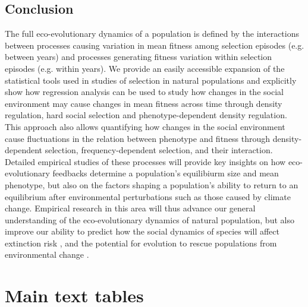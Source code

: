 \documentclass{article}
\begin{document}
\subsection{Conclusion}
 The full eco-evolutionary dynamics of a population is defined by the interactions between processes causing variation in mean fitness among selection episodes (e.g. between years) and processes generating fitness variation within selection episodes (e.g. within years). We provide an easily accessible expansion of the statistical tools used in studies of selection in natural populations and explicitly show how regression analysis can be used to study how changes in the social environment may cause changes in mean fitness across time through density regulation, hard social selection and phenotype-dependent density regulation. This approach also allows quantifying how changes in the social environment cause fluctuations in the relation between phenotype and fitness through density-dependent selection, frequency-dependent selection, and their interaction. Detailed empirical studies of these processes will provide key insights on how eco-evolutionary feedbacks determine a population's equilibiurm size and mean phenotype, but also on the factors shaping a population's ability to return to an equilibrium after environmental perturbations such as those caused by climate change. Empirical research in this area will thus advance our general understanding of the eco-evolutionary dynamics of natural population, but also improve our ability to predict how the social dynamics of species will affect extinction risk \citep{Angulo2018}, and the potential for evolution to rescue populations from environmental change \citep{Chevin2010}.





\newpage
\section{Main text tables}
\end{document}
